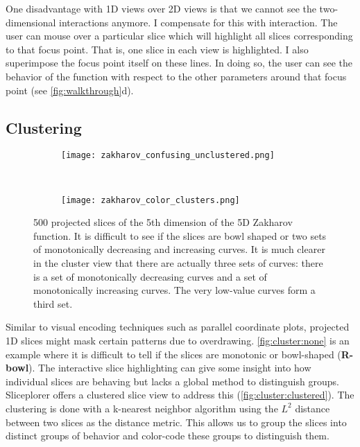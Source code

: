 One disadvantage with 1D views over 2D views is that we cannot see the
two-dimensional interactions anymore. I compensate for this with
interaction. %
The user can mouse over a particular slice which will highlight
all slices corresponding to that focus point. That is, one slice in each view is highlighted.
I also superimpose the focus point itself on these lines. In doing so,
the user can see the behavior of the function with respect to the other
parameters around that focus point (see \autoref{fig:walkthrough}d).

\subsection{Clustering}

\begin{figure}
  \centering
  \begin{subfigure}[b]{0.48\columnwidth}
    \texttt{[image: zakharov\_confusing\_unclustered.png]}
    \caption{
    }
    \label{fig:cluster:none}
  \end{subfigure}
  ~
  \begin{subfigure}[b]{0.48\columnwidth}
    \texttt{[image: zakharov\_color\_clusters.png]}
    \caption{
    }
    \label{fig:cluster:clustered}
  \end{subfigure}
  \caption[500 projected slices of the 5th dimension of the 5D Zakharov~\cite{Back:1996} function.]{%
    500 projected slices of the 5th dimension of the 5D Zakharov~\cite{Back:1996} 
    function. It is difficult to see if the slices are bowl shaped or two sets
    of monotonically decreasing and increasing curves. It is much clearer in 
    the cluster view that there are actually three sets of curves: 
    there is a set of monotonically decreasing curves and a set of 
    monotonically increasing curves. The very low-value curves form a third
    set.
  }
\end{figure}

Similar to visual encoding techniques such as parallel coordinate plots, projected 1D slices might mask certain patterns due to
overdrawing.
\autoref{fig:cluster:none} is an example where it is difficult to tell if the
slices are monotonic or bowl-shaped (\textbf{R-bowl}). The interactive slice highlighting
can give some insight into how individual slices are behaving but lacks
a global method to distinguish groups. Sliceplorer offers a
clustered slice view to address this (\autoref{fig:cluster:clustered}). 
The clustering is done with a k-nearest neighbor algorithm using the
$L^2$ distance between two slices as the distance metric.
This allows us to group the slices into distinct
groups of behavior and color-code these groups to distinguish them.

